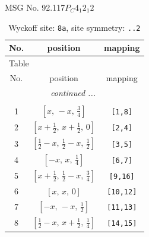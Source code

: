 \documentclass[fleqn,8pt]{jsarticle}
\begin{document}
\setcounter{MaxMatrixCols}{32}

\renewcommand{\tablename}{Table~}
\renewcommand{\figurename}{Figure~}
\begin{center}
\LARGE
MSG No. 92.117\quad$P_{C}4_{1}2_{1}2$
\end{center}
\renewcommand{\arraystretch}{1.2}
\begin{longtable}{ccc}
\caption{Wyckoff site: {\tt 8a}, site symmetry: {\tt ..2}}
 \\
 \hline \hline
No. & position & mapping \\ \hline \endfirsthead

\multicolumn{2}{l}{\tablename\ \thetable{}} \\
 \hline \hline
No. & position & mapping \\ \hline \endhead

 \hline \hline
\multicolumn{2}{r}{\footnotesize\it continued ...} \\ \endfoot

 \hline \hline
\multicolumn{2}{r}{} \\ \endlastfoot

1 & $\left[ x,\, - x,\, \frac{3}{4} \right]$ & {\tt [1,8]} \\ \hline
2 & $\left[ x + \frac{1}{2},\, x + \frac{1}{2},\, 0 \right]$ & {\tt [2,4]} \\ \hline
3 & $\left[ \frac{1}{2} - x,\, \frac{1}{2} - x,\, \frac{1}{2} \right]$ & {\tt [3,5]} \\ \hline
4 & $\left[ - x,\, x,\, \frac{1}{4} \right]$ & {\tt [6,7]} \\ \hline
5 & $\left[ x + \frac{1}{2},\, \frac{1}{2} - x,\, \frac{3}{4} \right]$ & {\tt [9,16]} \\ \hline
6 & $\left[ x,\, x,\, 0 \right]$ & {\tt [10,12]} \\ \hline
7 & $\left[ - x,\, - x,\, \frac{1}{2} \right]$ & {\tt [11,13]} \\ \hline
8 & $\left[ \frac{1}{2} - x,\, x + \frac{1}{2},\, \frac{1}{4} \right]$ & {\tt [14,15]} \\
\end{longtable}
\renewcommand{\arraystretch}{1.2}
\end{document}
